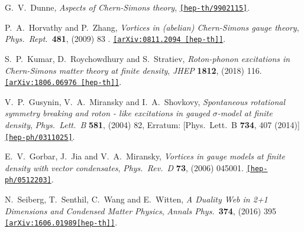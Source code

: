 \begin{thebibliography}{99}
 
  G.~V.~Dunne,
 {\it Aspects of Chern-Simons theory},
  \href{https://arxiv.org/abs/hep-th/9902115}{\tt[hep-th/9902115]}.

  P.~A.~Horvathy and P.~Zhang,
  {\it Vortices in (abelian) Chern-Simons gauge theory},
  {\it Phys.\ Rept.}\  {\bf 481}, (2009) 83 .
  \href{https://arxiv.org/abs/0811.2094}{\tt [arXiv:0811.2094 [hep-th]]}.

  S.~P.~Kumar, D.~Roychowdhury and S.~Stratiev,
 {\it Roton-phonon excitations in Chern-Simons matter theory at finite density},
  {\it JHEP} {\bf 1812}, (2018) 116.
  \href{https://arxiv.org/abs/1806.06976}{\tt[arXiv:1806.06976 [hep-th]]}.

  V.~P.~Gusynin, V.~A.~Miransky and I.~A.~Shovkovy,
 {\it Spontaneous rotational symmetry breaking and roton - like excitations in gauged $\sigma$-model at finite density}, 
  {\it Phys.\ Lett.\ B} {\bf 581},  (2004) 82,
  Erratum: [Phys.\ Lett.\ B {\bf 734}, 407 (2014)]
 \href{https://arxiv.org/abs/1404.1284}{\tt[hep-ph/0311025]}.
  


  E.~V.~Gorbar, J.~Jia and V.~A.~Miransky,
  {\it Vortices in gauge models at finite density with vector condensates},
  {\it Phys.\ Rev.\ D} {\bf 73}, (2006) 045001.
  \href{https://arxiv.org/abs/hep-ph/0512203}{\tt [hep-ph/0512203]}.
  
  N.~Seiberg, T.~Senthil, C.~Wang and E.~Witten,
  {\it A Duality Web in 2+1 Dimensions and Condensed Matter Physics},
  {\it Annals Phys.}\  {\bf 374}, (2016) 395 
  \href{https://arxiv.org/abs/1606.01989}{\tt[arXiv:1606.01989[hep-th]]}.
  

\end{thebibliography}
